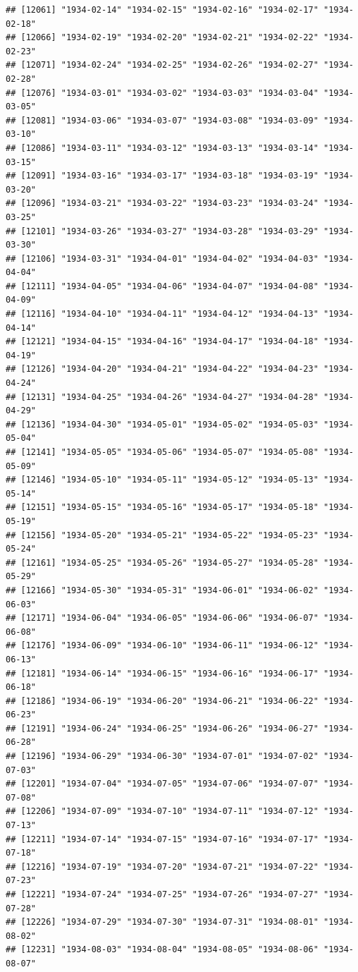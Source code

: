 \documentclass{article}\usepackage[]{graphicx}\usepackage[]{color}
\makeatletter
\newenvironment{kframe}{%
 \def\at@end@of@kframe{}%
 \ifinner\ifhmode%
  \def\at@end@of@kframe{\end{minipage}}%
  \begin{minipage}{\columnwidth}%
 \fi\fi%
 \def\FrameCommand##1{\hskip\@totalleftmargin \hskip-\fboxsep
 \colorbox{shadecolor}{##1}\hskip-\fboxsep
     \hskip-\linewidth \hskip-\@totalleftmargin \hskip\columnwidth}%
 \MakeFramed {\advance\hsize-\width
   \@totalleftmargin\z@ \linewidth\hsize
   \@setminipage}}%
 {\par\unskip\endMakeFramed%
 \at@end@of@kframe}
\newenvironment{knitrout}{}{} %
\makeatother
\begin{document}
\begin{description}
\begin{knitrout}
\begin{kframe}
\begin{verbatim}
## [12061] "1934-02-14" "1934-02-15" "1934-02-16" "1934-02-17" "1934-02-18"
## [12066] "1934-02-19" "1934-02-20" "1934-02-21" "1934-02-22" "1934-02-23"
## [12071] "1934-02-24" "1934-02-25" "1934-02-26" "1934-02-27" "1934-02-28"
## [12076] "1934-03-01" "1934-03-02" "1934-03-03" "1934-03-04" "1934-03-05"
## [12081] "1934-03-06" "1934-03-07" "1934-03-08" "1934-03-09" "1934-03-10"
## [12086] "1934-03-11" "1934-03-12" "1934-03-13" "1934-03-14" "1934-03-15"
## [12091] "1934-03-16" "1934-03-17" "1934-03-18" "1934-03-19" "1934-03-20"
## [12096] "1934-03-21" "1934-03-22" "1934-03-23" "1934-03-24" "1934-03-25"
## [12101] "1934-03-26" "1934-03-27" "1934-03-28" "1934-03-29" "1934-03-30"
## [12106] "1934-03-31" "1934-04-01" "1934-04-02" "1934-04-03" "1934-04-04"
## [12111] "1934-04-05" "1934-04-06" "1934-04-07" "1934-04-08" "1934-04-09"
## [12116] "1934-04-10" "1934-04-11" "1934-04-12" "1934-04-13" "1934-04-14"
## [12121] "1934-04-15" "1934-04-16" "1934-04-17" "1934-04-18" "1934-04-19"
## [12126] "1934-04-20" "1934-04-21" "1934-04-22" "1934-04-23" "1934-04-24"
## [12131] "1934-04-25" "1934-04-26" "1934-04-27" "1934-04-28" "1934-04-29"
## [12136] "1934-04-30" "1934-05-01" "1934-05-02" "1934-05-03" "1934-05-04"
## [12141] "1934-05-05" "1934-05-06" "1934-05-07" "1934-05-08" "1934-05-09"
## [12146] "1934-05-10" "1934-05-11" "1934-05-12" "1934-05-13" "1934-05-14"
## [12151] "1934-05-15" "1934-05-16" "1934-05-17" "1934-05-18" "1934-05-19"
## [12156] "1934-05-20" "1934-05-21" "1934-05-22" "1934-05-23" "1934-05-24"
## [12161] "1934-05-25" "1934-05-26" "1934-05-27" "1934-05-28" "1934-05-29"
## [12166] "1934-05-30" "1934-05-31" "1934-06-01" "1934-06-02" "1934-06-03"
## [12171] "1934-06-04" "1934-06-05" "1934-06-06" "1934-06-07" "1934-06-08"
## [12176] "1934-06-09" "1934-06-10" "1934-06-11" "1934-06-12" "1934-06-13"
## [12181] "1934-06-14" "1934-06-15" "1934-06-16" "1934-06-17" "1934-06-18"
## [12186] "1934-06-19" "1934-06-20" "1934-06-21" "1934-06-22" "1934-06-23"
## [12191] "1934-06-24" "1934-06-25" "1934-06-26" "1934-06-27" "1934-06-28"
## [12196] "1934-06-29" "1934-06-30" "1934-07-01" "1934-07-02" "1934-07-03"
## [12201] "1934-07-04" "1934-07-05" "1934-07-06" "1934-07-07" "1934-07-08"
## [12206] "1934-07-09" "1934-07-10" "1934-07-11" "1934-07-12" "1934-07-13"
## [12211] "1934-07-14" "1934-07-15" "1934-07-16" "1934-07-17" "1934-07-18"
## [12216] "1934-07-19" "1934-07-20" "1934-07-21" "1934-07-22" "1934-07-23"
## [12221] "1934-07-24" "1934-07-25" "1934-07-26" "1934-07-27" "1934-07-28"
## [12226] "1934-07-29" "1934-07-30" "1934-07-31" "1934-08-01" "1934-08-02"
## [12231] "1934-08-03" "1934-08-04" "1934-08-05" "1934-08-06" "1934-08-07"

\end{verbatim}
\end{kframe}
\end{knitrout}
\end{description}
\end{document}

